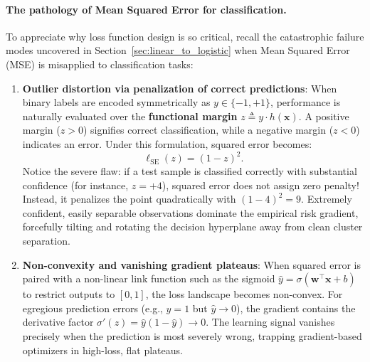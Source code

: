 \paragraph{The pathology of Mean Squared Error for classification.}
To appreciate why loss function design is so critical, recall the catastrophic failure modes uncovered in Section~\ref{sec:linear_to_logistic} when Mean Squared Error (MSE) is misapplied to classification tasks:
\begin{enumerate}[noitemsep,topsep=2pt,parsep=0pt,partopsep=0pt]
  \item \textbf{Outlier distortion via penalization of correct predictions}: When binary labels are encoded symmetrically as $y \in \{-1, +1\}$, performance is naturally evaluated over the \textbf{functional margin} $z \triangleq y \cdot h(\mathbf{x})$. A positive margin ($z > 0$) signifies correct classification, while a negative margin ($z < 0$) indicates an error. Under this formulation, squared error becomes:
  \begin{equation}
  \ell_{\text{SE}}(z) = (1 - z)^2.
  \label{eq:squared_error_margin}
  \end{equation}
  Notice the severe flaw: if a test sample is classified correctly with substantial confidence (for instance, $z = +4$), squared error does not assign zero penalty! Instead, it penalizes the point quadratically with $(1 - 4)^2 = 9$. Extremely confident, easily separable observations dominate the empirical risk gradient, forcefully tilting and rotating the decision hyperplane away from clean cluster separation.
  \item \textbf{Non-convexity and vanishing gradient plateaus}: When squared error is paired with a non-linear link function such as the sigmoid $\hat{y} = \sigma(\mathbf{w}^\top \mathbf{x} + b)$ to restrict outputs to $[0, 1]$, the loss landscape becomes non-convex. For egregious prediction errors (e.g., $y = 1$ but $\hat{y} \to 0$), the gradient contains the derivative factor $\sigma'(z) = \hat{y}(1 - \hat{y}) \to 0$. The learning signal vanishes precisely when the prediction is most severely wrong, trapping gradient-based optimizers in high-loss, flat plateaus.
\end{enumerate}

